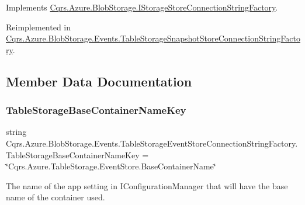 Implements \hyperlink{interfaceCqrs_1_1Azure_1_1BlobStorage_1_1IStorageStoreConnectionStringFactory_a26ecfd0805fe3d525e9fa419330bd140_a26ecfd0805fe3d525e9fa419330bd140}{Cqrs.\+Azure.\+Blob\+Storage.\+I\+Storage\+Store\+Connection\+String\+Factory}.



Reimplemented in \hyperlink{classCqrs_1_1Azure_1_1BlobStorage_1_1Events_1_1TableStorageSnapshotStoreConnectionStringFactory_a78f9987855e2c4c370c624b0edb97f4d_a78f9987855e2c4c370c624b0edb97f4d}{Cqrs.\+Azure.\+Blob\+Storage.\+Events.\+Table\+Storage\+Snapshot\+Store\+Connection\+String\+Factory}.



\subsection{Member Data Documentation}
\mbox{\label{classCqrs_1_1Azure_1_1BlobStorage_1_1Events_1_1TableStorageEventStoreConnectionStringFactory_a9aad5e7497e3f5192d3aaec8d5f7b5f8_a9aad5e7497e3f5192d3aaec8d5f7b5f8}} 
\subsubsection{\texorpdfstring{Table\+Storage\+Base\+Container\+Name\+Key}{TableStorageBaseContainerNameKey}}
{\footnotesize\ttfamily string Cqrs.\+Azure.\+Blob\+Storage.\+Events.\+Table\+Storage\+Event\+Store\+Connection\+String\+Factory.\+Table\+Storage\+Base\+Container\+Name\+Key = \char`\"{}Cqrs.\+Azure.\+Table\+Storage.\+Event\+Store.\+Base\+Container\+Name\char`\"{}\hspace{0.3cm}{\ttfamily [static]}}



The name of the app setting in I\+Configuration\+Manager that will have the base name of the container used. 

